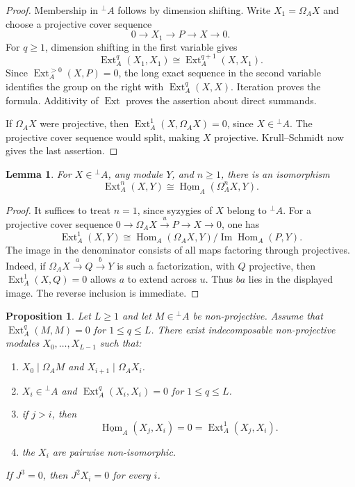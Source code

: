 \documentclass[a4paper,reqno]{amsart}
\numberwithin{equation}{section}
\newtheorem{proposition}[proposition]{Proposition}
\newtheorem{lemma}[lemma]{Lemma}
\newcommand{\Ext}{\operatorname{Ext}}
\newcommand{\Hom}{\operatorname{Hom}}
\newcommand{\perpA}{{}^{\perp}\!A}
\newcommand{\stableHom}{\underline{\Hom}}
\begin{document}
\begin{proof}
Membership in $\perpA$ follows by dimension shifting. Write
$X_1=\Omega_A X$ and choose a projective cover sequence
\[
 0\longrightarrow X_1\longrightarrow P\longrightarrow X
 \longrightarrow0.
\]
For $q\ge1$, dimension shifting in the first variable gives
\[
 \Ext_A^q(X_1,X_1)\cong\Ext_A^{q+1}(X,X_1).
\]
Since $\Ext_A^{>0}(X,P)=0$, the long exact sequence in the second
variable identifies the group on the right with $\Ext_A^q(X,X)$.
Iteration proves the formula. Additivity of $\Ext$ proves the
assertion about direct summands.

If $\Omega_A X$ were projective, then
$\Ext_A^1(X,\Omega_A X)=0$, since $X\in\perpA$. The projective cover
sequence would split, making $X$ projective. Krull--Schmidt now gives
the last assertion.
\end{proof}

\begin{lemma}\label{lem:stable-ext}
For $X\in\perpA$, any module $Y$, and $n\ge1$, there is an
isomorphism
\[
 \Ext_A^n(X,Y)\cong\stableHom_A(\Omega_A^nX,Y).
\]
\end{lemma}

\begin{proof}
It suffices to treat $n=1$, since syzygies of $X$ belong to $\perpA$.
For a projective cover sequence
$0\to\Omega_A X\xrightarrow{u}P\to X\to0$, one has
\[
 \Ext_A^1(X,Y)\cong
 \Hom_A(\Omega_A X,Y)/\operatorname{Im}\Hom_A(P,Y).
\]
The image in the denominator consists of all maps factoring through
projectives. Indeed, if $\Omega_A X\xrightarrow{a}Q\xrightarrow{b}Y$
is such a factorization, with $Q$ projective, then
$\Ext_A^1(X,Q)=0$ allows $a$ to extend across $u$. Thus $ba$ lies in
the displayed image. The reverse inclusion is immediate.
\end{proof}

\begin{proposition}\label{prop:chain}
Let $L\ge1$ and let $M\in\perpA$ be non-projective. Assume that
$\Ext_A^q(M,M)=0$ for $1\le q\le L$. There exist indecomposable
non-projective modules $X_0,\ldots,X_{L-1}$ such that:
\begin{enumerate}[label=\textnormal{(\roman*)},leftmargin=2.2em]
 \item {$X_0\mid\Omega_A M$ and $X_{i+1}\mid\Omega_A X_i$.}
 \item {$X_i\in\perpA$ and $\Ext_A^q(X_i,X_i)=0$ for $1\le q\le L$.}
 \item if $j>i$, then
 \[
 \stableHom_A(X_j,X_i)=0=\Ext_A^1(X_j,X_i).
 \]
 \item the $X_i$ are pairwise non-isomorphic.
\end{enumerate}
If $J^3=0$, then $J^2X_i=0$ for every $i$.
\end{proposition}
\end{document}
